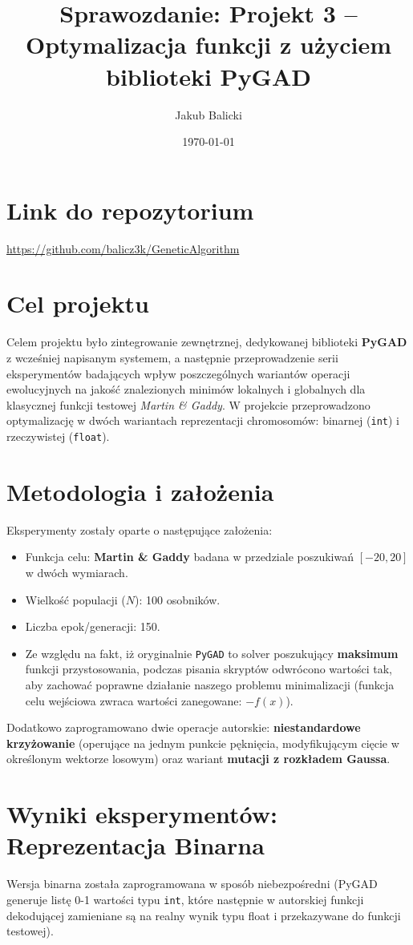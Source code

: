 \documentclass[12pt,a4paper]{article}
\title{Sprawozdanie: Projekt 3 -- Optymalizacja funkcji z użyciem biblioteki PyGAD}
\author{Jakub Balicki}
\date{\today}
\begin{document}
\maketitle

\section*{Link do repozytorium}
\url{https://github.com/balicz3k/GeneticAlgorithm}

\section{Cel projektu}
Celem projektu było zintegrowanie zewnętrznej, dedykowanej biblioteki \textbf{PyGAD} z wcześniej napisanym systemem, a następnie przeprowadzenie serii eksperymentów badających wpływ poszczególnych wariantów operacji ewolucyjnych na jakość znalezionych minimów lokalnych i globalnych dla klasycznej funkcji testowej \textit{Martin \& Gaddy}. W projekcie przeprowadzono optymalizację w dwóch wariantach reprezentacji chromosomów: binarnej (\texttt{int}) i rzeczywistej (\texttt{float}).

\section{Metodologia i założenia}
Eksperymenty zostały oparte o następujące założenia:
\begin{itemize}
    \item Funkcja celu: \textbf{Martin \& Gaddy} badana w przedziale poszukiwań $[-20, 20]$ w dwóch wymiarach.
    \item Wielkość populacji ($N$): 100 osobników.
    \item Liczba epok/generacji: 150.
    \item Ze względu na fakt, iż oryginalnie \texttt{PyGAD} to solver poszukujący \textbf{maksimum} funkcji przystosowania, podczas pisania skryptów odwrócono wartości tak, aby zachować poprawne działanie naszego problemu minimalizacji (funkcja celu wejściowa zwraca wartości zanegowane: $-f(x)$).
\end{itemize}

Dodatkowo zaprogramowano dwie operacje autorskie: \textbf{niestandardowe krzyżowanie} (operujące na jednym punkcie pęknięcia, modyfikującym cięcie w określonym wektorze losowym) oraz wariant \textbf{mutacji z rozkładem Gaussa}.

\section{Wyniki eksperymentów: Reprezentacja Binarna}
Wersja binarna została zaprogramowana w sposób niebezpośredni (PyGAD generuje listę 0-1 wartości typu \texttt{int}, które następnie w autorskiej funkcji dekodującej zamieniane są na realny wynik typu float i przekazywane do funkcji testowej).
\end{document}
